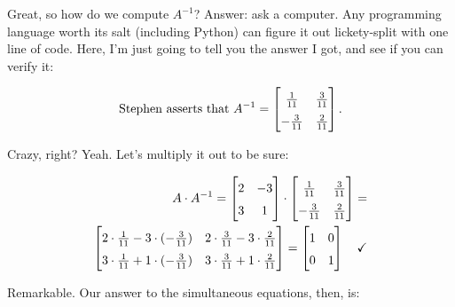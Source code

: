 \smallskip

\label{askPython1}
Great, so how do we compute $A^{-1}$? Answer: ask a computer. Any programming
language worth its salt (including Python) can figure it out lickety-split with
one line of code. Here, I'm just going to tell you the answer I got, and see if
you can verify it:

\vspace{-.15in}
\begin{align*}
\text{Stephen asserts that } A^{-1} =
\begingroup
\renewcommand*{\arraystretch}{1.5}
\begin{bmatrix}
\frac{1}{11} & \frac{3}{11} \\
-\frac{3}{11} & \frac{2}{11} \\
\end{bmatrix}.
\endgroup
\end{align*}
\vspace{-.15in}

Crazy, right? Yeah. Let's multiply it out to be sure:

\vspace{-.15in}
\begin{align*}
A \cdot A^{-1} =
\begin{bmatrix}
2 & -3 \\
3 & 1 \\
\end{bmatrix} \cdot
\begin{bmatrix}
\frac{1}{11} & \frac{3}{11} \\
-\frac{3}{11} & \frac{2}{11} \\
\end{bmatrix} = \\
\begingroup
\renewcommand*{\arraystretch}{1.5}
\begin{bmatrix}
2\cdot\frac{1}{11} - 3\cdot(-\frac{3}{11}) &
2\cdot\frac{3}{11} - 3\cdot\frac{2}{11} \\
3\cdot\frac{1}{11} + 1\cdot(-\frac{3}{11}) &
3\cdot\frac{3}{11} + 1\cdot\frac{2}{11} \\
\end{bmatrix} =
\endgroup
\begin{bmatrix}
1 & 0 \\
0 & 1 \\
\end{bmatrix} \quad \checkmark
\end{align*}
\vspace{-.15in}

Remarkable. Our answer to the simultaneous equations, then, is:

